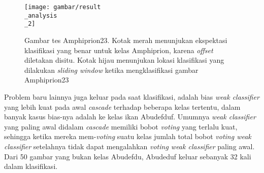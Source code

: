 		\begin{figure}[H]
			\centering{}
			  \texttt{[image: gambar/result\\\_analysis\\\_2]}
			\caption{Gambar tes Amphiprion23. Kotak merah menunjukan ekspektasi klasifikasi 
			yang benar untuk kelas Amphiprion, karena \textit{offset} diletakan disitu. Kotak 
			hijau menunjukan lokasi klasifikasi yang dilakukan \emph{sliding window} ketika mengklasifikasi 
			gambar Amphiprion23}
		\end{figure}
		
		Problem baru lainnya juga keluar pada saat klasifikasi, adalah 
		bias \emph{weak classifier} yang lebih kuat pada awal \emph{cascade} terhadap beberapa kelas tertentu, dalam 
		banyak kasus bias-nya adalah ke kelas ikan Abudefduf. Umumnya \emph{weak classifier} yang paling awal 
		didalam \emph{cascade} memiliki bobot \textit{voting} yang terlalu kuat, sehingga ketika mereka mem-\textit{voting} 
		suatu kelas jumlah total bobot \textit{voting weak classifier} setelahnya tidak dapat mengalahkan 
		\textit{voting weak classifier} paling awal. Dari 50 gambar yang bukan kelas Abudefdu, Abudeduf keluar sebanyak 
		32 kali dalam klasifikasi.
		
		

\begin{comment}

\end{comment}
